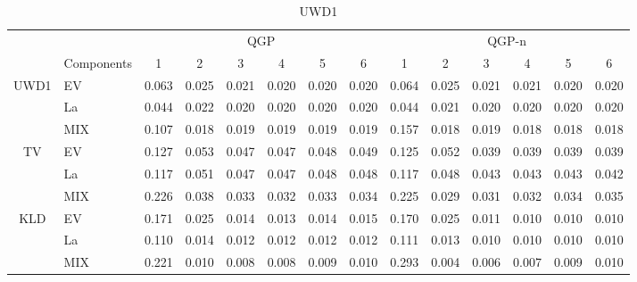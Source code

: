 \documentclass[preprint,12pt,authoryear]{elsarticle}
\begin{document}
\begin{table}[hbt!]
\footnotesize
\centering
\caption{UWD1}
\begin{adjustbox}{center}
\begin{tabular}{clcccccc|cccccc}
& & \multicolumn{6}{c}{QGP} & \multicolumn{6}{c}{QGP-n} \\
\cmidrule(lr){3-8} \cmidrule(lr){9-14}
& Components & 1 & 2 & 3 & 4 & 5 & 6 & 1 & 2 & 3 & 4 & 5 & 6 \\
\midrule
\multirow{3}{*}{UWD1} &
EV & 0.063 & 0.025 & 0.021 & 0.020 & 0.020 & 0.020 & 
      0.064 & 0.025 & 0.021 & 0.021 & 0.020 & 0.020\\
 & La & 0.044 & 0.022 & 0.020 & 0.020 & 0.020 & 0.020 & 
      0.044 & 0.021 & 0.020 & 0.020 & 0.020 & 0.020 \\
 & MIX & 0.107 & 0.018 & 0.019 & 0.019 & 0.019 & 0.019 & 
      0.157 & 0.018 & 0.019 & 0.018 & 0.018 & 0.018 \\
      \hline
\multirow{3}{*}{TV} &
EV & 0.127 & 0.053 & 0.047 & 0.047 & 0.048 & 0.049 &
      0.125 & 0.052 & 0.039 & 0.039 & 0.039 & 0.039\\
 & La & 0.117 & 0.051 & 0.047 & 0.047 & 0.048 & 0.048 &
      0.117 & 0.048 & 0.043 & 0.043 & 0.043 & 0.042 \\
 & MIX & 0.226 & 0.038 & 0.033 & 0.032 & 0.033 & 0.034 &
      0.225 & 0.029 & 0.031 & 0.032 & 0.034 & 0.035 \\
      \hline
\multirow{3}{*}{KLD} &
EV & 0.171 & 0.025 & 0.014 & 0.013 & 0.014 & 0.015 & 
      0.170 & 0.025 & 0.011 & 0.010 & 0.010 & 0.010\\
& La & 0.110 & 0.014 & 0.012 & 0.012 & 0.012 & 0.012 & 
      0.111 & 0.013 & 0.010 & 0.010 & 0.010 & 0.010 \\
& MIX & 0.221 & 0.010 & 0.008 & 0.008 & 0.009 & 0.010 & 
      0.293 & 0.004 & 0.006 & 0.007 & 0.009 & 0.010
\end{tabular}
\end{adjustbox}
\end{table}
\end{document}
